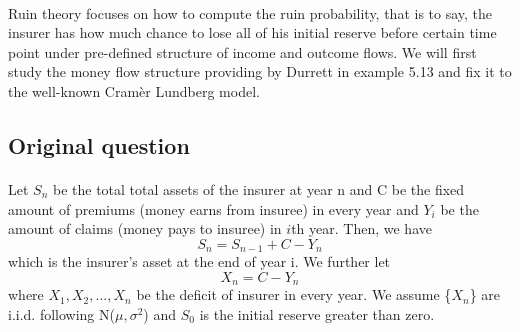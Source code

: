 \documentclass[project2.tex]{subfiles}
\begin{document}
\paragraph{}
Ruin theory focuses on how to compute the ruin probability, that is to say, the insurer has how much chance to lose all of his initial reserve before certain time point under pre-defined structure of income and outcome flows. We will first study the money flow structure providing by Durrett in example 5.13 and fix it to the well-known Cram\`er Lundberg model.
\subsection{Original question}
\paragraph{}
Let $S_n$ be the total total assets of the insurer at year n and C be the fixed amount of premiums (money earns from insuree) in every year and  $Y_i$ be the amount of claims (money pays to insuree) in $i$th year. Then, we have
$$S_n=S_{n-1}+C-Y_n$$ which is the insurer's asset at the end of year i. We further let $$X_n=C-Y_n$$ where $X_1, X_2, ..., X_n$ be the deficit of insurer in every year. We assume \{$X_n$\} are i.i.d. following N($\mu,\sigma^2$) and $S_0$ is the initial reserve greater than zero.
\end{document}
